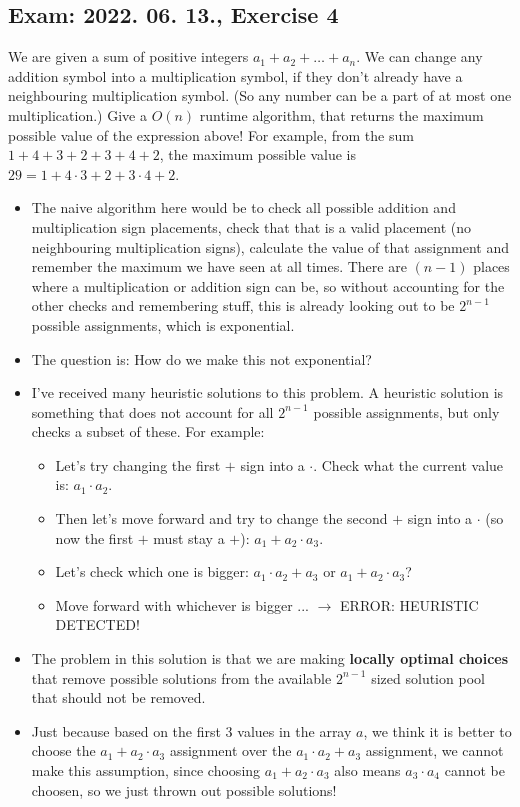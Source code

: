 \subsection{Exam: 2022. 06. 13., Exercise 4}


We are given a sum of positive integers $a_1 + a_2 + \dots{} + a_n$. We can change any addition symbol into a multiplication symbol, if they don't already have a neighbouring multiplication symbol. (So any number can be a part of at most one multiplication.) Give a $O(n)$ runtime algorithm, that returns the maximum possible value of the expression above! For example, from the sum $1+4+3+2+3+4+2$, the maximum possible value is $29=1+4\cdot{}3+2+3\cdot{}4+2$. 

\begin{itemize}
    \item The naive algorithm here would be to check all possible addition and multiplication sign placements, check that that is a valid placement (no neighbouring multiplication signs), calculate the value of that assignment and remember the maximum we have seen at all times. There are $(n-1)$ places where a multiplication or addition sign can be, so without accounting for the other checks and remembering stuff, this is already looking out to be $2^{n-1}$ possible assignments, which is exponential.
    \item The question is: How do we make this not exponential?
    \item I've received many heuristic solutions to this problem. A heuristic solution is something that does not account for all $2^{n-1}$ possible assignments, but only checks a subset of these. For example:
    \begin{itemize}
        \item Let's try changing the first $+$ sign into a $\cdot{}$. Check what the current value is: $a_1\cdot{}a_2$.
        \item Then let's move forward and try to change the second $+$ sign into a $\cdot{}$ (so now the first $+$ must stay a $+$): $a_1+a_2\cdot{}a_3$.
        \item Let's check which one is bigger: $a_1\cdot{}a_2+a_3$ or $a_1+a_2\cdot{}a_3$?
        \item Move forward with whichever is bigger ... $\rightarrow$ ERROR: HEURISTIC DETECTED!
    \end{itemize}
    \item The problem in this solution is that we are making \textbf{locally optimal choices} that remove possible solutions from the available $2^{n-1}$ sized solution pool that should not be removed.
    \item Just because based on the first $3$ values in the array $a$, we think it is better to choose the $a_1+a_2\cdot{}a_3$ assignment over the $a_1\cdot{}a_2+a_3$ assignment, we cannot make this assumption, since choosing $a_1+a_2\cdot{}a_3$ also means $a_3\cdot{}a_4$ cannot be choosen, so we just thrown out possible solutions!
\end{itemize}

